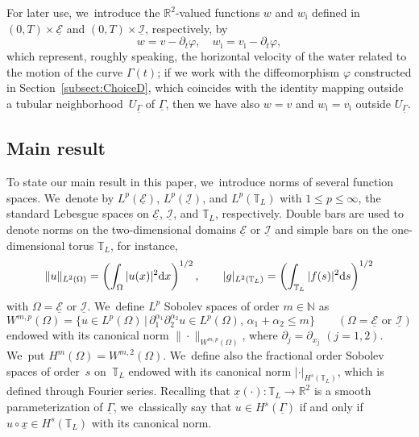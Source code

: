 \documentclass[JEP,XML,SOM,Unicode,NoFloatCountersInSection,published]{cedram}
\newcommand{\R}{{\mathbb R}}
\newcommand{\N}{{\mathbb N}}
\newcommand{\dt}{\partial_t}
\newcommand{\cI}{{\mathcal I}}
\newcommand{\cE}{{\mathcal E}}
\newcommand{\ul}[1]{\underline{#1}}
\newcommand{\itGamma}{\mathit{\Gamma}}
\theoremstyle{definition}
\begin{document}
For later use, we~introduce the $\R^2$-valued functions $w$ and $w_\mathrm{i}$ defined in $(0,T)\times\ul{\cE}$ and $(0,T)\times\ul{\cI}$, respectively, by
\begin{equation}\label{defw}
w=v-\dt\varphi, \quad w_\mathrm{i}=v_\mathrm{i}-\dt\varphi,
\end{equation}
which represent, roughly speaking, the horizontal velocity of the water related to the motion of the curve $\itGamma(t)$;
if we work with the diffeomorphism $\varphi$ constructed in Section~\ref{subsect:ChoiceD},
which coincides with the identity mapping outside a tubular neighborhood~$U_{\ul{\itGamma}}$ of $\ul{\itGamma}$,
then we have also $w=v$ and $w_\mathrm{i}=v_\mathrm{i}$ outside $U_{\ul{\itGamma}}$.

\subsection{Main result}\label{subsect:result}
To state our main result in this paper, we~introduce norms of several function spaces. We~denote by $L^p(\ul{\cE})$, $L^p(\ul{\cI})$, and $L^p(\mathbb{T}_L)$ with $1\leq p\leq \infty$,
the standard Lebesgue spaces on $\ul{\cE}$, $\ul{\cI}$, and $\mathbb{T}_L$, respectively.
Double bars are used to denote norms on the two-dimensional domains $\ul{\cE}$ or $\ul{\cI}$ and simple bars on the one-dimensional torus $\mathbb{T}_L$,
for instance,
\[
\|u\|_{L^2(\Omega)}=\left(\int_\Omega |u(x)|^2 {\rm d}x \right)^{1/2}, \qquad
|g|_{L^2(\mathbb{T}_L)}=\left(\int_{\mathbb{T}_L} |f(s)|^2 {\rm d}s \right)^{1/2}
\]
with $\Omega=\ul{\cE}$ or $\ul{\cI}$. We~define $L^p$ Sobolev spaces of order $m\in \N$ as
\[
W^{m,p}(\Omega)=\{ u\in L^p(\Omega) \,|\, \partial_1^{\alpha_1}\partial_2^{\alpha_2} u \in L^p(\Omega),\, \alpha_1+\alpha_2\leq m\}
\qquad (\Omega=\ul{\cE} \mbox{ or } \ul{\cI})
\]
endowed with its canonical norm $\|\cdot\|_{W^{m,p}(\Omega)}$, where $\partial_j=\partial_{x_j}$ $(j=1,2)$. We~put $H^m(\Omega)=W^{m,2}(\Omega)$. We~define also the fractional order Sobolev spaces of order~$s$ on~$\mathbb{T}_L$ endowed with its canonical norm $|\cdot|_{H^s(\mathbb{T}_L)}$,
which is defined through Fourier series.
Recalling that $\ul{x}(\cdot):{\mathbb T}_L\to {\mathbb R}^2$ is a smooth parameterization of $\ul{\itGamma}$, we~classically say that $u\in H^s(\ul{\itGamma})$ if and only if $u\circ\ul{x}\in H^s({\mathbb T}_L)$ with its canonical norm.
\end{document}
